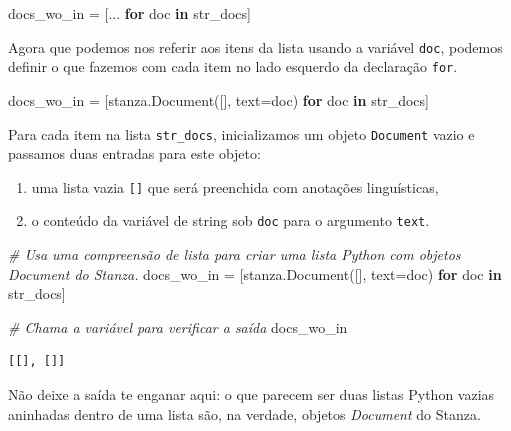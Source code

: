 \documentclass[
  brazilian,
]{article}
\newenvironment{Shaded}{}{}
\newcommand{\CommentTok}[1]{\textcolor[rgb]{0.38,0.63,0.69}{\textit{#1}}}
\newcommand{\ControlFlowTok}[1]{\textcolor[rgb]{0.00,0.44,0.13}{\textbf{#1}}}
\newcommand{\KeywordTok}[1]{\textcolor[rgb]{0.00,0.44,0.13}{\textbf{#1}}}
\newcommand{\NormalTok}[1]{#1}
\newcommand{\OperatorTok}[1]{\textcolor[rgb]{0.40,0.40,0.40}{#1}}
\providecommand{\tightlist}{%
  \setlength{\itemsep}{0pt}\setlength{\parskip}{0pt}}
\begin{document}
\begin{Shaded}
\begin{Highlighting}[]
\NormalTok{docs\_wo\_in }\OperatorTok{=}\NormalTok{ [... }\ControlFlowTok{for}\NormalTok{ doc }\KeywordTok{in}\NormalTok{ str\_docs]}
\end{Highlighting}
\end{Shaded}

Agora que podemos nos referir aos itens da lista usando a variável
\texttt{doc}, podemos definir o que fazemos com cada item no lado
esquerdo da declaração \texttt{for}.

\begin{Shaded}
\begin{Highlighting}[]
\NormalTok{docs\_wo\_in }\OperatorTok{=}\NormalTok{ [stanza.Document([], text}\OperatorTok{=}\NormalTok{doc) }\ControlFlowTok{for}\NormalTok{ doc }\KeywordTok{in}\NormalTok{ str\_docs]}
\end{Highlighting}
\end{Shaded}

Para cada item na lista \texttt{str\_docs}, inicializamos um objeto
\texttt{Document} vazio e passamos duas entradas para este objeto:

\begin{enumerate}
\def\labelenumi{\arabic{enumi}.}
\tightlist
\item
  uma lista vazia \texttt{{[}{]}} que será preenchida com anotações
  linguísticas,
\item
  o conteúdo da variável de string sob \texttt{doc} para o argumento
  \texttt{text}.
\end{enumerate}

\begin{Shaded}
\begin{Highlighting}[]
\CommentTok{\# Usa uma compreensão de lista para criar uma lista Python com objetos Document do Stanza.}
\NormalTok{docs\_wo\_in }\OperatorTok{=}\NormalTok{ [stanza.Document([], text}\OperatorTok{=}\NormalTok{doc) }\ControlFlowTok{for}\NormalTok{ doc }\KeywordTok{in}\NormalTok{ str\_docs]}

\CommentTok{\# Chama a variável para verificar a saída}
\NormalTok{docs\_wo\_in}
\end{Highlighting}
\end{Shaded}

\begin{verbatim}
[[], []]
\end{verbatim}

Não deixe a saída te enganar aqui: o que parecem ser duas listas Python
vazias aninhadas dentro de uma lista são, na verdade, objetos
\emph{Document} do Stanza.
\end{document}
